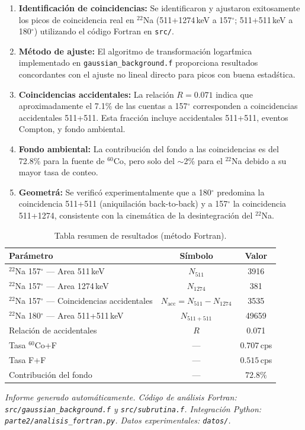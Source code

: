 \documentclass[12pt,a4paper]{article}
\begin{document}
\begin{enumerate}
  \item \textbf{Identificaci\'on de coincidencias:} Se identificaron y ajustaron
        exitosamente los picos de coincidencia real en $^{22}$Na (511+1274\,keV a 157$^\circ$;
        511+511\,keV a 180$^\circ$) utilizando el c\'odigo Fortran en \texttt{src/}.
  \item \textbf{M\'etodo de ajuste:} El algoritmo de transformaci\'on logar\'tmica
        implementado en \texttt{gaussian\_background.f} proporciona resultados concordantes
        con el ajuste no lineal directo para picos con buena estad\'stica.
  \item \textbf{Coincidencias accidentales:} La relaci\'on $R = 0.071$ indica que
        aproximadamente el 7.1\% de las cuentas a 157$^\circ$ corresponden a
        coincidencias accidentales 511+511. Esta fracci\'on incluye accidentales 511+511,
        eventos Compton, y fondo ambiental.
  \item \textbf{Fondo ambiental:} La contribuci\'on del fondo a las coincidencias es del
        72.8\% para la fuente de $^{60}$Co, pero solo del $\sim$2\% para el $^{22}$Na
        debido a su mayor tasa de conteo.
  \item \textbf{Geometr\'a:} Se verific\'o experimentalmente que a 180$^\circ$ predomina
        la coincidencia 511+511 (aniquilaci\'on back-to-back) y a 157$^\circ$ la
        coincidencia 511+1274, consistente con la cinem\'atica de la desintegraci\'on
        del $^{22}$Na.
\end{enumerate}

\begin{table}[htbp]
\centering
\caption{Tabla resumen de resultados (m\'etodo Fortran).}
\label{tab:resumen_final}
\begin{tabular}{lcc}
\hline \hline
Par\'ametro & S\'imbolo & Valor \\
\hline
$^{22}$Na 157$^\circ$ --- Area 511\,keV & $N_{511}$ & 3916 \\
$^{22}$Na 157$^\circ$ --- Area 1274\,keV & $N_{1274}$ & 381 \\
$^{22}$Na 157$^\circ$ --- Coincidencias accidentales & $N_{\text{acc}} = N_{511} - N_{1274}$ & 3535 \\
$^{22}$Na 180$^\circ$ --- Area 511+511\,keV & $N_{511+511}$ & 49659 \\
Relaci\'on de accidentales & $R$ & 0.071 \\
Tasa $^{60}$Co+F & --- & $0.707$\,cps \\
Tasa F+F & --- & $0.515$\,cps \\
Contribuci\'on del fondo & --- & $72.8\%$ \\
\hline
\end{tabular}
\end{table}

\vfill
\noindent\small\textit{Informe generado autom\'aticamente. C\'odigo de an\'alisis Fortran: \texttt{src/gaussian\_background.f} y \texttt{src/subrutina.f}. Integraci\'on Python: \texttt{parte2/analisis\_fortran.py}. Datos experimentales: \texttt{datos/}.}
\end{document}
